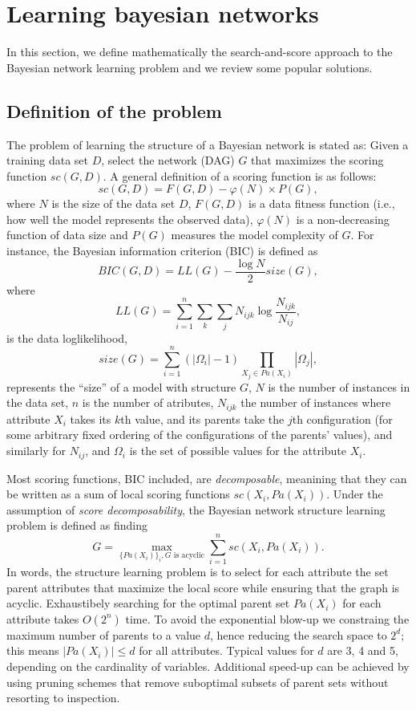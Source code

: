 \section{Learning bayesian networks}
\label{sec:learning}

In this section, we define mathematically the search-and-score approach
to the Bayesian network learning problem and we review some popular
solutions.

\subsection{Definition of the problem}
\label{subsec:definition}

The problem of learning the structure of a Bayesian network is stated as: Given a training data set $D $, select the network (DAG) $G$ that maximizes the scoring function ${sc}( G , D )$.
A general definition of a scoring function is as follows:
	\[ {sc}( G , D ) = F( G, D ) - \varphi( N ) \times P( G ) ,\]
where $N$ is the size of the data set $D$, $F( G, D )$ is a data fitness function (i.e., how well the model represents the observed data), $\varphi( N )$ is a non-decreasing function of data size and $P( G )$ measures the model complexity of $G$. For instance,  the Bayesian information criterion (BIC) is defined as
	\[ {BIC}( G , D ) = {LL}( G ) - \frac{\log N}{2} {size}( G ) ,\]
where
	\[ {LL}( G ) = \sum_{i=1}^{n} \sum_{k} \sum_{j} N_{ijk} \log \frac{N_{ijk}}{N_{ij}} ,\] is the data loglikelihood, 
	\[ {size}( G ) = \sum_{i=1}^{n} ( |\Omega_i| - 1 ) \prod_{X_j \in {Pa}( X_i )} |\Omega_j| ,\] represents the ``size'' of a model with structure $G$, 
$N$ is the number of instances in the data set, $n$ is the number of atributes, $N_{ijk}$ the number of instances where attribute $X_i$ takes its $k$th value, and its parents take the $j$th configuration (for some arbitrary fixed ordering of the configurations of the parents' values), and similarly  for $N_{ij}$, and $\Omega_i$ is the set of possible values for the attribute $X_i$.

        Most scoring functions, BIC included, are \emph{decomposable}, meanining that they can be written as a sum of local scoring functions $sc(X_i, {Pa}(X_i))$. Under the assumption of \emph{score decomposability}, the Bayesian network structure learning problem is defined as finding
	\[ G = \max_{\{ {Pa}(X_i)\}_i, G \text{ is acyclic}} \sum_{i=1}^n {sc}( X_i , {Pa}( X_i ) ) . \]
In words, the structure learning problem is to select for each attribute the set parent attributes that maximize the local score while ensuring that the graph is acyclic. Exhaustibely searching for the optimal parent set ${Pa}( X_i)$ for each attribute takes $O(2^n)$ time. To avoid the exponential blow-up we constraing the maximum number of parents to a value $d$, hence reducing the search space to $2^d$; this means $|{Pa}( X_i )| \leq d$ for all attributes. Typical values for $d$ are 3, 4 and 5, depending on the cardinality of variables. Additional speed-up can be achieved by using pruning schemes that remove suboptimal subsets of parent sets without resorting to inspection.

